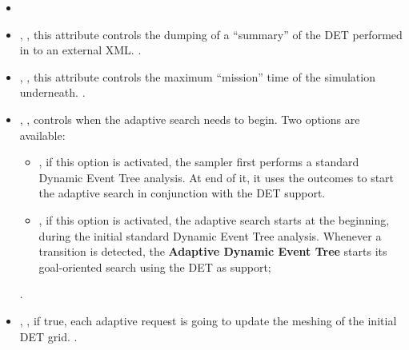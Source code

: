 \begin{itemize}
  \itemsep0em
  \item \nameDescription
  \item {}, ,
    this attribute controls the dumping of a ``summary'' of the DET performed in
    to an external XML.
    .
  \item {}, , this
    attribute controls the maximum ``mission'' time of the simulation
    underneath.
    .
  \item {}, , controls when the
    adaptive search needs to begin.
    Two options are available:
    \begin{itemize}
       \item {}, if this option is activated, the sampler first
         performs a standard Dynamic Event Tree analysis. At end of it, it uses
         the outcomes to start the adaptive search in conjunction with the DET
         support.
       \item {}, if this option is activated, the adaptive
         search starts at the beginning, during the initial standard Dynamic
         Event Tree analysis.
         Whenever a transition is detected, the
         \textbf{Adaptive Dynamic Event Tree} starts its goal-oriented search
         using the DET as support;
    \end{itemize}
      .
  \item {}, , if true,
    each adaptive request is going to update the meshing of the initial DET
    grid.
    .
\end{itemize}
